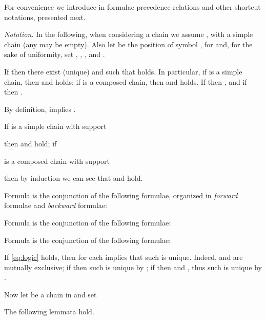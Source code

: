\documentclass[10pt,a4paper,runningheads]{llncs}
\begin{document}
For convenience we introduce in formulae precedence relations and other
shortcut notations, presented next.


\noindent\textit{Notation.} In the following, when considering a chain  we assume ,
with  a simple chain (any  may be empty).
Also let  be the position of symbol , for 
and, for the sake of uniformity, set , ,  , and .







 If  then there exist (unique)  and  such that  holds. 
In particular,  if  is a simple chain, then  and  holds;
if  is a composed chain, 
then  and    holds. If  then ,
and if  then .

\noindent By definition,  implies .

\noindent  If 
is a simple chain with support

then 
and  hold; 
if 

is a composed chain with support

then by induction we can see that  and
 hold.



\medskip


Formula  is the conjunction of the following formulae, organized in \emph{forward} formulae
and \emph{backward} formulae:

\medskip
{}


\medskip
{}





\noindent
Formula  is the conjunction of the following formulae:


\noindent
Formula  is the conjunction of the following formulae:









\begin{remark}
\label{rem:unique}
If \eqref{eq:logic} holds, then for each   implies that such  is unique.
Indeed,  and  are mutually exclusive;
if  then such  is unique by ;
if  then  and , thus such  is unique by .
\end{remark}



Now let  be a chain in 
and set


The following lemmata hold.
\end{document}
